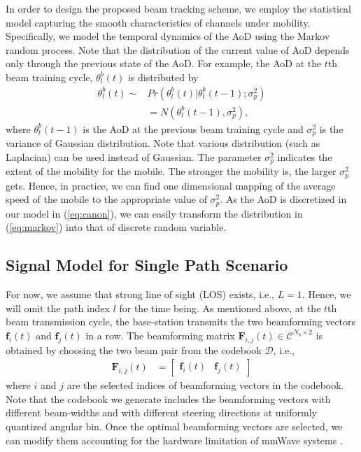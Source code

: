 \documentclass[conference]{IEEEtran}
\begin{document}
In order to design the proposed beam tracking scheme, we employ the statistical model capturing the smooth characteristics of channels under mobility. Specifically, we  model the temporal dynamics of the AoD using the Markov random process.
Note that the distribution of the current value of AoD depends only through  the previous state of the AoD. For example, the AoD at the $t$th beam training cycle,  $\theta_l^{b}(t)$ is distributed by
  \begin{align} \label{eq:markov}
  \theta_l^{b}(t)  \sim & Pr\left(  \theta_l^{b}(t)| \theta_l^{b}(t-1);  \sigma_p^2 \right) \\
  &=  N(\theta_l^{b}(t-1), \sigma_p^2), \label{eq:model}
    \end{align}
where $\theta_l^{b}(t-1)$ is the AoD at the previous beam training cycle and $\sigma_{p}^2$ is the variance of Gaussian distribution.   Note that various distribution (such as Laplacian) can be used instead of Gaussian.
The parameter $\sigma_{p}^2$  indicates the extent of the mobility for the mobile. The stronger the mobility is, the larger $\sigma_{p}^2$ gets. Hence, in practice, we can find one dimensional mapping of the average speed of the mobile to the appropriate value of $\sigma_{p}^2$.
As the AoD is discretized in our model in (\ref{eq:canon}), we can easily transform the distribution in (\ref{eq:markov}) into that of discrete random variable.

\subsection{Signal Model for Single Path Scenario}

For now, we assume that strong line of sight (LOS) exists, i.e., $L=1$. Hence, we will omit the path index $l$ for the time being.
As mentioned above, at the $t$th beam transmission cycle, the base-station  transmits the two beamforming vectors $\mathbf{f}_{i}(t)$ and $\mathbf{f}_{j}(t)$ in a row. The beamforming matrix $\mathbf{F}_{i,j}(t) \in \mathcal{C}^{N_b \times 2}$ is obtained by choosing the two beam pair from the codebook $\mathcal{D}$, i.e.,
\begin{align}
\mathbf{F}_{i,j}(t) & =
    \begin{bmatrix}
       \mathbf{f}_{i}(t) & \mathbf{f}_{j}(t)
     \end{bmatrix}
\end{align}
where $i$ and $j$ are the selected indices of beamforming vectors in the codebook.
Note that the codebook we generate includes the beamforming vectors with different beam-widths and with different steering directions at uniformly quantized angular bin.
Once the optimal beamforming vectors are selected, we can modify them accounting for the hardware limitation of mmWave systems \cite{ref:static_chan_precoding}.
\end{document}
